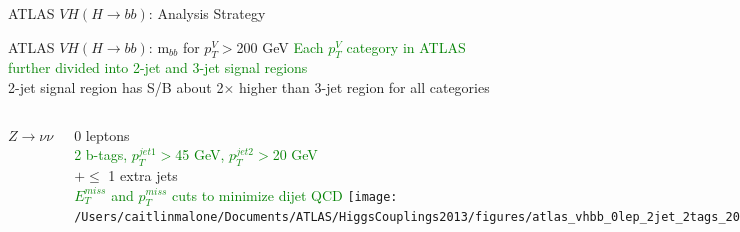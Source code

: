 \documentclass{beamer}
\begin{document}
\begin{frame}{ATLAS $VH (H\rightarrow bb)$: Analysis Strategy}
	
\end{frame}



\begin{frame}{ATLAS $VH (H\rightarrow bb)$: m$_{bb}$ for $p_T^V>$200 GeV}
	\scriptsize
	\textcolor{Green}{Each $p_T^V$ category in ATLAS further divided into 2-jet and 3-jet signal regions}\\
	2-jet signal region has S/B about 2$\times$ higher than 3-jet region for all categories\\

	\vspace{0.3cm}

	\begin{columns}[c]
	
			\begin{center} \scriptsize $Z\rightarrow\nu\nu$ \\ \end{center} 
			\tiny{0 leptons\\
			\textcolor{Green}{2 b-tags, $p_T^{jet1}>$45 GeV, $p_T^{jet2}>$20 GeV\\}
			$+\le$ 1 extra jets\\
			\textcolor{Green}{$E^{miss}_{T}$ and $p_T^{miss}$ cuts to minimize dijet QCD}
			}
			\texttt{[image: /Users/caitlinmalone/Documents/ATLAS/HiggsCouplings2013/figures/atlas\_vhbb\_0lep\_2jet\_2tags\_200GeV.pdf]}\\
			
			
			\begin{center} \scriptsize $W\rightarrow l\nu$ \\ \end{center} 
			\tiny{1 lepton\\
			\textcolor{Green}{2 b-tags, $p_T^{jet1}>$45 GeV, $p_T^{jet2}>$20 GeV\\}
			$+\le$ 1 extra jets\\
			\textcolor{Green}{$E^{miss}_{T}>$ 25 GeV\\}
			$m_T^W<$120 GeV
			}
			\texttt{[image: /Users/caitlinmalone/Documents/ATLAS/HiggsCouplings2013/figures/atlas\_vhbb\_1lep\_2jet\_2tags\_200GeV.pdf]}\\
			
			\begin{center} \scriptsize $Z\rightarrow ll$ \\ \end{center} 
			\tiny{2 leptons\\
			\textcolor{Green}{2 b-tags, $p_T^{jet1}>$45 GeV, $p_T^{jet2}>$20 GeV\\}
			$+\le$ 1 extra jets\\
			\textcolor{Green}{$E^{miss}_{T}<$ 60 GeV\\}
			83$<m_{ll}<$99 GeV
			}		
			\texttt{[image: /Users/caitlinmalone/Documents/ATLAS/HiggsCouplings2013/figures/atlas\_vhbb\_2lep\_2jet\_2tags\_200GeV.pdf]}\\
			
	\end{columns}
\end{frame}
\end{document}
